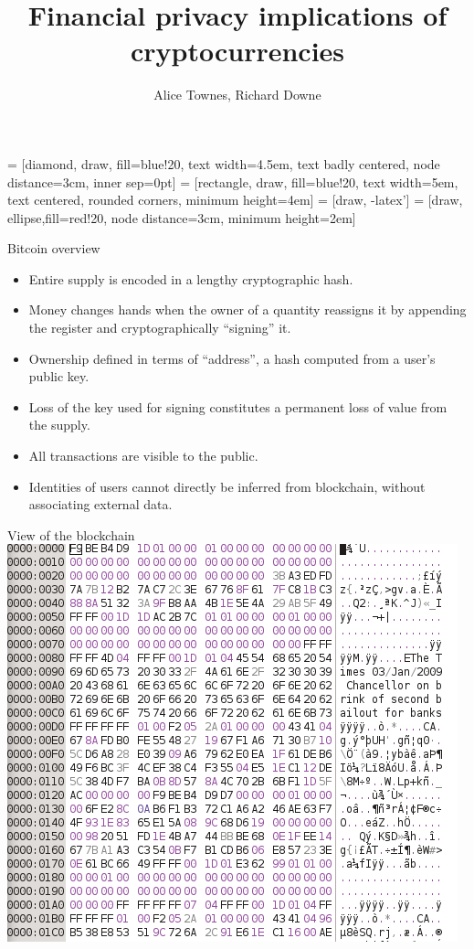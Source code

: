 \documentclass{beamer}
\title{Financial privacy implications of cryptocurrencies}
\author{Alice Townes, Richard Downe}
\begin{document}
 = [diamond, draw, fill=blue!20, 
    text width=4.5em, text badly centered, node distance=3cm, inner sep=0pt]
 = [rectangle, draw, fill=blue!20, 
    text width=5em, text centered, rounded corners, minimum height=4em]
 = [draw, -latex']
 = [draw, ellipse,fill=red!20, node distance=3cm,
    minimum height=2em]
    
\begin{frame}
 \titlepage
\end{frame}

\begin{frame}
 Bitcoin overview
 \begin{itemize}
  \item Entire supply is encoded in a lengthy cryptographic hash.
  \item Money changes hands when the owner of a quantity reassigns it by appending the register and cryptographically ``signing'' it.
  \item Ownership defined in terms of ``address'', a hash computed from a user's public key.
  \item Loss of the key used for signing constitutes a permanent loss of value from the supply.
  \item All transactions are visible to the public.
  \item Identities of users cannot directly be inferred from blockchain, without associating external data.
 \end{itemize}
\end{frame}
 
\begin{frame}
  View of the blockchain\\
  \vspace{1em}
  \includegraphics[height=0.7\textheight]{blockchain}
\end{frame}
\end{document}
